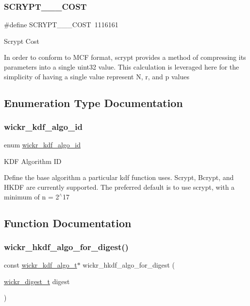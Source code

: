\subsubsection{\texorpdfstring{S\+C\+R\+Y\+P\+T\+\_\+\_\+\_\+\+C\+O\+ST}{SCRYPT\_2\_17\_COST}}
{\footnotesize\ttfamily \#define S\+C\+R\+Y\+P\+T\+\_\+\_\+\_\+\+C\+O\+ST~1116161}

Scrypt Cost

In order to conform to M\+CF format, scrypt provides a method of compressing its parameters into a single uint32 value. This calculation is leveraged here for the simplicity of having a single value represent N, r, and p values 

\subsection{Enumeration Type Documentation}
\mbox{\label{group__wickr__kdf_ga106149e3507106abb6b5be843a4e7c16}} 
\subsubsection{\texorpdfstring{wickr\+\_\+kdf\+\_\+algo\+\_\+id}{wickr\_kdf\_algo\_id}}
{\footnotesize\ttfamily enum \mbox{\hyperlink{group__wickr__kdf_ga106149e3507106abb6b5be843a4e7c16}{wickr\+\_\+kdf\+\_\+algo\+\_\+id}}}

K\+DF Algorithm ID

Define the base algorithm a particular kdf function uses. Scrypt, Bcrypt, and H\+K\+DF are currently supported. The preferred default is to use scrypt, with a minimum of n = 2$^\wedge$17 

\subsection{Function Documentation}
\mbox{\label{group__wickr__kdf_ga81c7a5adea69d04e019dd58080268a08}} 
\subsubsection{\texorpdfstring{wickr\+\_\+hkdf\+\_\+algo\+\_\+for\+\_\+digest()}{wickr\_hkdf\_algo\_for\_digest()}}
{\footnotesize\ttfamily const \mbox{\hyperlink{structwickr__kdf__algo}{wickr\+\_\+kdf\+\_\+algo\+\_\+t}}$\ast$ wickr\+\_\+hkdf\+\_\+algo\+\_\+for\+\_\+digest (\begin{DoxyParamCaption}\item[{\mbox{\hyperlink{structwickr__digest}{wickr\+\_\+digest\+\_\+t}}}]{digest }\end{DoxyParamCaption})}

